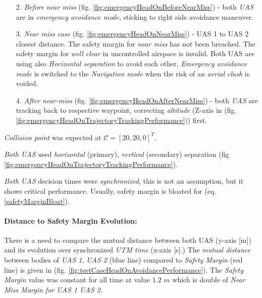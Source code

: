 \begin{itemize}
    \item[2.] \emph{Before near miss} (fig. \ref{fig:emergencyHeadOnBeforeNearMiss}) - both \emph{UAS} are in \emph{emergency avoidance mode}, sticking to right side avoidance maneuver.
    
    \item[3.] \emph{Near miss case} (fig. \ref{fig:emergencyHeadOnNearMiss}) - UAS 1 to UAS 2 closest distance. The safety margin for \emph{near miss} has not been breached. The safety margin for \emph{well clear} in uncontrolled airspace is invalid. Both UAS are using also \emph{Horizontal separation} to avoid each other, \emph{Emergency avoidance mode} is switched to the \emph{Navigation mode} when the risk of an \emph{aerial clash} is voided.
    
    \item[4.] \emph{After near-miss} (fig. \ref{fig:emergencyHeadOnAfterNearMiss}) - both \emph{UAS} are tracking back to respective waypoint, correcting \emph{altitude} (Z-axis in (fig. \ref{fig:emergencyHeadOnTrajectoryTrackingPerformance})) first.
\end{itemize}

\begin{note} 
	\emph{Collision point} was expected at $\mathscr{C}=[20,20,0]^T$.
\end{note}

\begin{note}    
	\emph{Both UAS} used \emph{horizontal} (primary), \emph{vertical} (secondary) separation (fig \ref{fig:emergencyHeadOnTrajectoryTrackingPerformance}).
\end{note}

\begin{note} 
	\emph{Both UAS} decision times were \emph{synchronized}, this is not an assumption, but it shows critical performance. Usually, safety margin is bloated for (eq.\ref{safetyMarginBloat}).
\end{note}

\paragraph{Distance to Safety Margin Evolution:} There is a need to compare the mutual distance between both UAS (y-axis [m]) and its evolution over synchronized \emph{UTM time} (x-axis [s].) The \emph{mutual distance} between bodies of \emph{UAS 1}, \emph{UAS 2} (blue line) compared to \emph{Safety Margin} (red line) is given in (fig. \ref{fig:testCaseHeadOnAvoidancePerformance}). The \emph{Safety Margin} value was constant for all time at value $1.2$ $m$ which is double of \emph{Near Miss Margin for UAS 1 UAS 2}.

